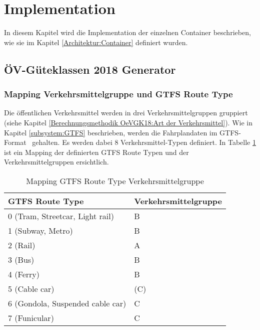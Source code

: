 
\section{Implementation}
\label{Implementation}

In diesem Kapitel wird die Implementation der einzelnen Container beschrieben, wie sie im Kapitel \ref{Architektur:Container} definiert wurden.

\subsection{ÖV-Güteklassen 2018 Generator}
\label{Implementation:ÖV-Güteklassen 2018 Generator}

\subsubsection{Mapping Verkehrsmittelgruppe und GTFS Route Type}
\label{ÖV-Güteklassen 2018 Generator:Mapping Verkehrsmittelgruppe und GTFS Route Type}

Die öffentlichen Verkehrsmittel werden in drei Verkehrsmittelgruppen gruppiert (siehe Kapitel \ref{Berechnungsmethodik OeVGK18:Art der Verkehrsmittel}).
Wie in Kapitel \ref{subsystem:GTFS} beschrieben, werden die Fahrplandaten im \acs{GTFS}-Format~\cite{gtfs_spec} gehalten. 
Es werden dabei 8 Verkehrsmittel-Typen definiert.
In Tabelle \ref{table:Mapping GTFS Route Type Verkehrsmittelgruppe} ist ein Mapping der definierten GTFS Route Typen und der Verkehrsmittelgruppen ersichtlich.

\begin{table}[ht]
    \centering
    \begin{tabular}[ht]{l l}
        \toprule
        \textbf{GTFS Route Type} 
                                & \textbf{Verkehrsmittelgruppe}\\
        \midrule
        0 (Tram, Streetcar, Light rail)
                                & B\\
        1 (Subway, Metro)
                                & B\\
        2 (Rail)
                                & A\\
        3 (Bus)
                                & B\\
        4 (Ferry)
                                & B\\
        5 (Cable car)
                                & (C)\\
        6 (Gondola, Suspended cable car)
                                & C\\
        7 (Funicular)
                                & C\\            
        \bottomrule
    \end{tabular}
    \caption{Mapping GTFS Route Type Verkehrsmittelgruppe}
    \label{table:Mapping GTFS Route Type Verkehrsmittelgruppe}
\end{table}
